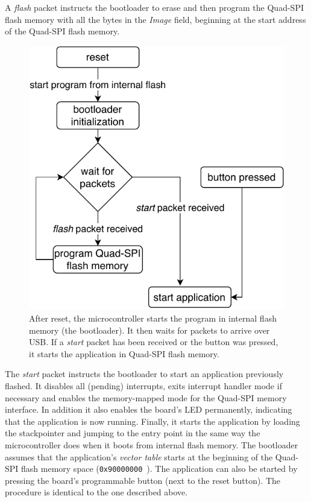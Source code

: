 A \textit{flash} packet instructs the bootloader to erase and then program the Quad-SPI flash memory
with all the bytes in the \textit{Image} field, beginning at the start address of the Quad-SPI flash
memory.

\begin{figure}[ht]
    \centering
    \includegraphics[scale=1.0]{img/bootloader_flowchart.pdf}
    \caption[Bootloader program flow]{
        After reset, the microcontroller starts the program in internal flash memory (the bootloader).
        It then waits for packets to arrive over USB. If a \textit{start} packet has been received or
        the button was pressed, it starts the application in Quad-SPI flash memory.
    }
\end{figure}

The \textit{start} packet instructs the bootloader to start an application previously flashed. It
disables all (pending) interrupts, exits interrupt handler mode if necessary and enables the
memory-mapped mode for the Quad-SPI memory interface. In addition it also enables the board's LED
permanently, indicating that the application is now running. Finally, it starts the application by
loading the stackpointer and jumping to the entry point in the same way the microcontroller does
when it boots from internal flash memory. The bootloader assumes that the application's \textit{vector table}
starts at the beginning of the Quad-SPI flash memory space (\lstinline{0x90000000}~\cite{mcu-ref-manual}).
The application can also be started by pressing the board's programmable button (next to the reset
button). The procedure is identical to the one described above.

